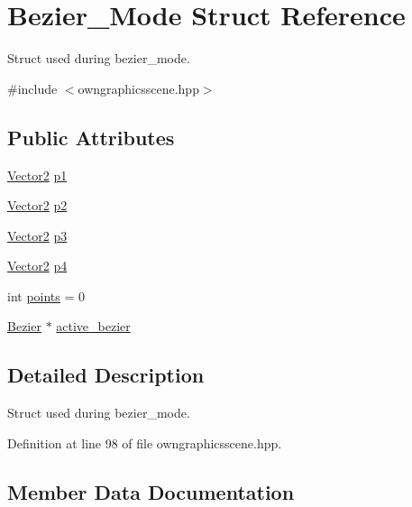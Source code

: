 \hypertarget{structBezier__Mode}{}\section{Bezier\+\_\+\+Mode Struct Reference}
\label{structBezier__Mode}


Struct used during bezier\+\_\+mode.  




{\ttfamily \#include $<$owngraphicsscene.\+hpp$>$}

\subsection*{Public Attributes}
\begin{DoxyCompactItemize}
\item 
\mbox{\hyperlink{classVector2}{Vector2}} \mbox{\hyperlink{structBezier__Mode_a2d7c5ccccb03114fd1b26a20843a59e4}{p1}}
\item 
\mbox{\hyperlink{classVector2}{Vector2}} \mbox{\hyperlink{structBezier__Mode_a96ed0f4076e540e5a8789f25f9bf65e9}{p2}}
\item 
\mbox{\hyperlink{classVector2}{Vector2}} \mbox{\hyperlink{structBezier__Mode_ad9fbff84a5248923ceb29433dc58f49b}{p3}}
\item 
\mbox{\hyperlink{classVector2}{Vector2}} \mbox{\hyperlink{structBezier__Mode_a5a3df46137ba62eaf3f9c0ad1ee391ef}{p4}}
\item 
int \mbox{\hyperlink{structBezier__Mode_a5389426ea819f66e663684f6244c3960}{points}} = 0
\item 
\mbox{\hyperlink{classBezier}{Bezier}} $\ast$ \mbox{\hyperlink{structBezier__Mode_a9aefbd869ef59854732e405886d334fb}{active\+\_\+bezier}}
\end{DoxyCompactItemize}


\subsection{Detailed Description}
Struct used during bezier\+\_\+mode. 

Definition at line 98 of file owngraphicsscene.\+hpp.



\subsection{Member Data Documentation}
\mbox{\label{structBezier__Mode_a9aefbd869ef59854732e405886d334fb}} 
